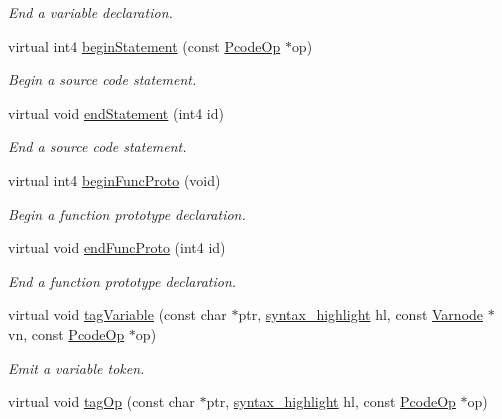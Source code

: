 \begin{DoxyCompactItemize}
\begin{DoxyCompactList}\small\item\em End a variable declaration. \end{DoxyCompactList}\item 
virtual int4 \mbox{\hyperlink{class_emit_pretty_print_a5100568fd6f499acafd9b7f47b700153}{begin\+Statement}} (const \mbox{\hyperlink{class_pcode_op}{Pcode\+Op}} $\ast$op)
\begin{DoxyCompactList}\small\item\em Begin a source code statement. \end{DoxyCompactList}\item 
virtual void \mbox{\hyperlink{class_emit_pretty_print_ab19e4ce2f8b1028e41d217d6c762ef7a}{end\+Statement}} (int4 id)
\begin{DoxyCompactList}\small\item\em End a source code statement. \end{DoxyCompactList}\item 
virtual int4 \mbox{\hyperlink{class_emit_pretty_print_a242bc11dbb30efeb41f7e4ad39169450}{begin\+Func\+Proto}} (void)
\begin{DoxyCompactList}\small\item\em Begin a function prototype declaration. \end{DoxyCompactList}\item 
virtual void \mbox{\hyperlink{class_emit_pretty_print_a4eac637afa829305fb6cda48ed09bcbb}{end\+Func\+Proto}} (int4 id)
\begin{DoxyCompactList}\small\item\em End a function prototype declaration. \end{DoxyCompactList}\item 
virtual void \mbox{\hyperlink{class_emit_pretty_print_a2011607fe7e41704351bb7d653f9e205}{tag\+Variable}} (const char $\ast$ptr, \mbox{\hyperlink{class_emit_xml_a7c3577436da429c3c75f4b82cac6864f}{syntax\+\_\+highlight}} hl, const \mbox{\hyperlink{class_varnode}{Varnode}} $\ast$vn, const \mbox{\hyperlink{class_pcode_op}{Pcode\+Op}} $\ast$op)
\begin{DoxyCompactList}\small\item\em Emit a variable token. \end{DoxyCompactList}\item 
virtual void \mbox{\hyperlink{class_emit_pretty_print_a6bfae2b37b1af030c6edb7315b6ab805}{tag\+Op}} (const char $\ast$ptr, \mbox{\hyperlink{class_emit_xml_a7c3577436da429c3c75f4b82cac6864f}{syntax\+\_\+highlight}} hl, const \mbox{\hyperlink{class_pcode_op}{Pcode\+Op}} $\ast$op)

\end{DoxyCompactItemize}
